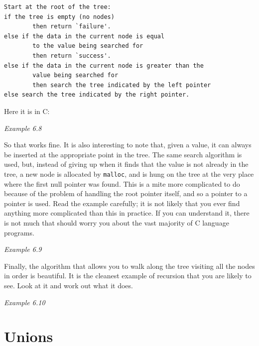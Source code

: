    \begin{Verbatim}
Start at the root of the tree:
if the tree is empty (no nodes)
        then return `failure'.
else if the data in the current node is equal
        to the value being searched for
        then return `success'.
else if the data in the current node is greater than the
        value being searched for
        then search the tree indicated by the left pointer
else search the tree indicated by the right pointer.
\end{Verbatim}

   Here it is in C:


   \begin{center}\textit{Example 6.8}\end{center}


   So that works fine. It is also interesting to note that, given a value,
    it can always be inserted at the appropriate point in the tree. The same
    search algorithm is used, but, instead of giving up when it finds that the
    value is not already in the tree, a new node is allocated by
    \texttt{malloc}, and is hung on the tree at the very place where the
    first null pointer was found. This is a mite more complicated to do because
    of the problem of handling the root pointer itself, and so a pointer to
    a pointer is used. Read the example carefully; it is not likely that you
    ever find anything more complicated than this in practice. If you can
    understand it, there is not much that should worry you about the vast
    majority of C language programs.


   \begin{center}\textit{Example 6.9}\end{center}


   Finally, the algorithm that allows you to walk along the tree visiting
    all the nodes in order is beautiful. It is the cleanest example of
    recursion that you are likely to see. Look at it and work out what it
    does.


   \begin{center}\textit{Example 6.10}\end{center}


  

 
        \section{Unions}
        


